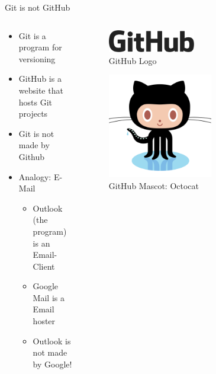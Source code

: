\documentclass[compress,aspectratio=169]{beamer}
\begin{document}
  \begin{frame}{Git is not GitHub}
    \begin{columns}
      \begin{column}{0.6\textwidth}
        \begin{itemize}
          \item Git is a program for versioning
          \item GitHub is a website that hosts Git projects
          \item Git is not made by Github
          \item Analogy: E-Mail
            \begin{itemize}
              \item Outlook (the program) is an Email-Client
              \item Google Mail is a Email hoster
              \item Outlook is not made by Google!
            \end{itemize}
        \end{itemize}
      \end{column}
      \begin{column}{0.4\textwidth}
        \begin{figure}
          \includegraphics[width=0.5\textwidth]{./assets/GitHub.png}
          \caption{GitHub Logo \cite{ghlogo}}
        \end{figure}
        \begin{figure}
          \includegraphics[width=0.6\textwidth]{./assets/octocat.png}
          \caption{GitHub Mascot: Octocat \cite{octodex}}
        \end{figure}
      \end{column}
    \end{columns}
  \end{frame}
\end{document}
